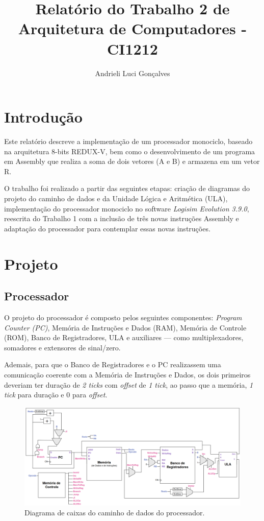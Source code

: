 \documentclass[twocolumn, 11pt]{article}
\author{Andrieli Luci Gonçalves}
\title{Relatório do Trabalho 2 de Arquitetura de Computadores - CI1212}
\begin{document}
\maketitle        

\section{Introdução}

Este relatório descreve a implementação de um processador monociclo, baseado na arquitetura 8-bits REDUX-V, bem como o desenvolvimento de um programa em Assembly que realiza a soma de dois vetores (A e B) e armazena em um vetor R.

O trabalho foi realizado a partir das seguintes etapas: criação de diagramas do projeto do caminho de dados e da Unidade Lógica e Aritmética (ULA), implementação do processador monociclo no software \textit{Logisim Evolution 3.9.0}, reescrita do Trabalho 1 com a inclusão de três novas instruções Assembly e adaptação do processador para contemplar essas novas instruções. 

\section{Projeto}

\subsection{Processador}

O projeto do processador é composto pelos seguintes componentes: \textit{Program Counter (PC)}, Memória de Instruções e Dados (RAM), Memória de Controle (ROM), Banco de Registradores, ULA e auxiliares — como multiplexadores, somadores e extensores de sinal/zero.

Ademais, para que o Banco de Registradores e o PC realizassem uma comunicação coerente com a Memória de Instruções e Dados, os dois primeiros deveriam ter duração de \textit{2 ticks} com \textit{offset} de \textit{1 tick}, ao passo que a memória, \textit{1 tick} para duração e 0 para \textit{offset}.

\begin{figure}[h]
    \centering
    \includegraphics[width=0.9\linewidth]{datapath_processador.png}
    \caption{Diagrama de caixas do caminho de dados do processador.}
    \label{fig:enter-label}
\end{figure}
\end{document}
